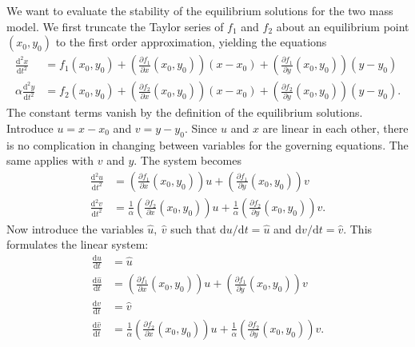 We want to evaluate the stability of the equilibrium solutions for the two mass model.
We first truncate the Taylor series of \(f_1\) and \(f_2\) about an equilibrium point \((x_0,y_0)\) to the first order approximation, yielding the equations
\begin{equation}
    \begin{aligned}
        \frac{\mathrm{d}^2x}{\mathrm{d}t^2} &= f_1(x_0,y_0) + \left(\frac{\partial f_1}{\partial x}(x_0,y_0)\right)(x-x_0) + \left(\frac{\partial f_1}{\partial y}(x_0,y_0)\right)(y-y_0) \\
        \alpha\frac{\mathrm{d}^2y}{\mathrm{d}t^2} &= f_2(x_0,y_0) + \left(\frac{\partial f_2}{\partial x}(x_0,y_0)\right)(x-x_0) + \left(\frac{\partial f_2}{\partial y}(x_0,y_0)\right)(y-y_0).
    \end{aligned}
\end{equation}
The constant terms vanish by the definition of the equilibrium solutions.
Introduce \(u = x-x_0\) and \(v=y-y_0\).
Since $u$ and $x$ are linear in each other, there is no complication in changing between variables for the governing equations.
The same applies with $v$ and $y$.
The system becomes
\begin{equation}
    \begin{aligned}
        \frac{\mathrm{d}^2u}{\mathrm{d}t^2} &= \left(\frac{\partial f_1}{\partial x}(x_0,y_0)\right)u + \left(\frac{\partial f_1}{\partial y}(x_0,y_0)\right)v \\
        \frac{\mathrm{d}^2v}{\mathrm{d}t^2} &= \frac{1}{\alpha}\left(\frac{\partial f_2}{\partial x}(x_0,y_0)\right)u + \frac{1}{\alpha}\left(\frac{\partial f_2}{\partial y}(x_0,y_0)\right)v.
    \end{aligned}
\end{equation}
Now introduce the variables $\hat{u},~\hat{v}$ such that \(\mathrm{d}u/\mathrm{d}t = \hat{u}\) and \(\mathrm{d}v/\mathrm{d}t = \hat{v}\). This formulates the linear system:
\begin{equation}
    \begin{aligned}
        \frac{\mathrm{d}u}{\mathrm{d}t} &= \hat{u} \\
        \frac{\mathrm{d}\hat{u}}{\mathrm{d}t} &= \left(\frac{\partial f_1}{\partial x}(x_0,y_0)\right)u + \left(\frac{\partial f_1}{\partial y}(x_0,y_0)\right)v \\
        \frac{\mathrm{d}v}{\mathrm{d}t} &= \hat{v} \\
        \frac{\mathrm{d}\hat{v}}{\mathrm{d}t} &= \frac{1}{\alpha}\left(\frac{\partial f_2}{\partial x}(x_0,y_0)\right)u + \frac{1}{\alpha}\left(\frac{\partial f_2}{\partial y}(x_0,y_0)\right)v.
    \end{aligned}
\end{equation}
